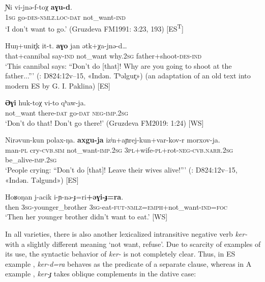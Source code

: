 \documentclass[output=paper,colorlinks,citecolor=brown]{langscibook}
\begin{document}
\ea\label{ex:niv:77}
    \gll Ɲi vi-jnə{}-f-toχ \textbf{aɣu-d}. \\ 
         \textsc{1sg} go-\textsc{des-nmlz.loc-dat} not\_want-\textsc{ind} \\
    \glt ‘I don’t want to go.’ (Gruzdeva FM1991: 3:23, 193) [ES\textsuperscript{T}]
\z 

\ea\label{ex:niv:78}
    \gll Huŋ+unir̥k it-t. \textbf{aɣo} jan ətk+χa-jnə{}-d… \\
         that+cannibal say-\textsc{ind} not\_want why.\textsc{2sg} father+shoot-\textsc{des-ind}\\
    \glt ‘This cannibal says: “Don’t do [that]! Why are you going to shoot at the father...”’ (\cite{KreinovichMs}: D824:12v–15, «Indən. Tʰəlgur̥») (an adaptation of an old text into modern ES by G. I. Paklina) [ES]
\z 

\ea\label{ex:niv:79}
    \gll \textbf{Əɣi} huk-toχ vi-to qʰaw-ja. \\ 
         not\_want there-\textsc{dat} go-\textsc{dat} \textsc{neg}{}-\textsc{imp.2sg} \\
    \glt ‘Don’t do that! Don’t go there!’ (Gruzdeva FM2019: 1:24) [WS]
\z 

\ea\label{ex:niv:80}
    \gll Nirǝvun-kun polax-ŋa. \textbf{axgu-ja} izʲn+aɲrej-kun+var-kov-r morxov-ja. \\ 
         man-\textsc{pl} cry-\textsc{cvb.sim} not\_want-\textsc{imp.2sg} \textsc{3pl}+wife-\textsc{pl}+rot-\textsc{neg-cvb.narr.2sg} be\_alive-\textsc{imp.2sg}\\
    \glt ‘People crying: “Don’t do [that]! Leave their wives alive!”’ (\cite{KreinovichMs}: D824:12v–15, «Indən. Təlgund») [ES]
\z 

\ea\label{ex:niv:81}
    \gll Hoʁoŋan j-acik i-ɲ{}-nə{}-ɟ=ri\textbf{+əɣi-ɟ=ra}. \\ 
         then \textsc{3sg}{}-younger\_brother \textsc{3sg}{}-eat-\textsc{fut-nmlz=emph}+not\_want-\textsc{ind=foc} \\
    \glt ‘Then her younger brother didn’t want to eat.’ \citep[163]{Panfilov1965} [WS]
\z 

In all varieties, there is also another lexicalized intransitive negative verb \textit{ker-} with a slightly different meaning ‘not want, refuse’. Due to scarcity of examples of its use, the syntactic behavior of \textit{ker-} is not completely clear. Thus, in ES example , \textit{ker-d=ra} behaves as the predicate of a separate clause, whereas in A example , \textit{ker-ɟ} takes oblique complements in the dative case:
\end{document}
